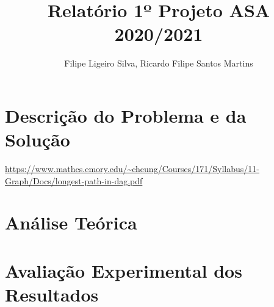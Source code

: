 \documentclass[a4paper, 12pt]{article}
\author{Filipe Ligeiro Silva, Ricardo Filipe Santos Martins}
\title{Relatório 1º Projeto ASA 2020/2021}
\date{}
\begin{document}
\section*{Descrição do Problema e da Solução}
\url{https://www.mathcs.emory.edu/~cheung/Courses/171/Syllabus/11-Graph/Docs/longest-path-in-dag.pdf}
\section*{Análise Teórica}
\section*{Avaliação Experimental dos Resultados}
\end{document}
